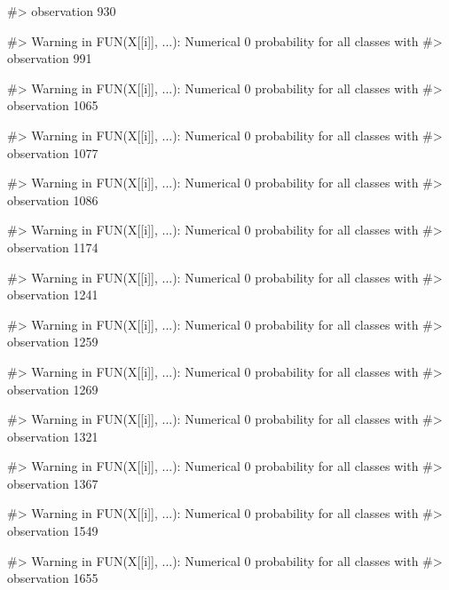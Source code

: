 \begin{Schunk}
\begin{Soutput}
#> observation 930
\end{Soutput}
\begin{Soutput}
#> Warning in FUN(X[[i]], ...): Numerical 0 probability for all classes with
#> observation 991
\end{Soutput}
\begin{Soutput}
#> Warning in FUN(X[[i]], ...): Numerical 0 probability for all classes with
#> observation 1065
\end{Soutput}
\begin{Soutput}
#> Warning in FUN(X[[i]], ...): Numerical 0 probability for all classes with
#> observation 1077
\end{Soutput}
\begin{Soutput}
#> Warning in FUN(X[[i]], ...): Numerical 0 probability for all classes with
#> observation 1086
\end{Soutput}
\begin{Soutput}
#> Warning in FUN(X[[i]], ...): Numerical 0 probability for all classes with
#> observation 1174
\end{Soutput}
\begin{Soutput}
#> Warning in FUN(X[[i]], ...): Numerical 0 probability for all classes with
#> observation 1241
\end{Soutput}
\begin{Soutput}
#> Warning in FUN(X[[i]], ...): Numerical 0 probability for all classes with
#> observation 1259
\end{Soutput}
\begin{Soutput}
#> Warning in FUN(X[[i]], ...): Numerical 0 probability for all classes with
#> observation 1269
\end{Soutput}
\begin{Soutput}
#> Warning in FUN(X[[i]], ...): Numerical 0 probability for all classes with
#> observation 1321
\end{Soutput}
\begin{Soutput}
#> Warning in FUN(X[[i]], ...): Numerical 0 probability for all classes with
#> observation 1367
\end{Soutput}
\begin{Soutput}
#> Warning in FUN(X[[i]], ...): Numerical 0 probability for all classes with
#> observation 1549
\end{Soutput}
\begin{Soutput}
#> Warning in FUN(X[[i]], ...): Numerical 0 probability for all classes with
#> observation 1655
\end{Soutput}
\begin{Soutput}

\end{Soutput}
\end{Schunk}
